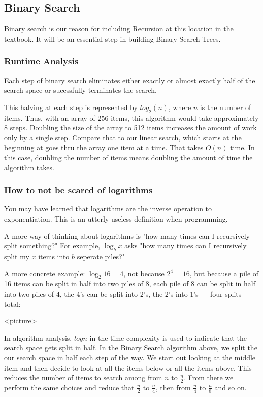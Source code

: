 \subsection{Binary Search}
Binary search is our reason for including Recursion at this location in the textbook.   It will be an essential step in building Binary Search Trees.







\subsubsection{Runtime Analysis}
Each step of binary search eliminates either exactly or almost exactly half of the search space or sucessfully terminates the search.

This halving at each step is represented by $log_2(n)$, where $n$ is the number of items.  Thus, with an array of 256 items, this algorithm would take approximately 8 steps. Doubling the size of the array to 512 items increases the amount of work only by a single step.   Compare that to our linear search, which starts at the beginning at goes thru the array one item at a time.  That takes $O(n)$ time.  In this case, doubling the number of items means doubling the amount of time the algorithm takes.





\subsubsection{How to not be scared of logarithms }
You may have learned that logarithms are the inverse operation to exponentiation.
This is an utterly useless definition when programming.


A more way of thinking about logarithms is "how many times can I recursively split something?"
For example, $\log_b x$ asks "how many times can I recursively split my $x$ items into $b$ seperate piles?"

A more concrete example: $\log_2 16 = 4$, not because $2^4 = 16$, but because a pile of 16 items can be split in half into two piles of 8, each pile of 8 can be split in half into two piles of 4, the 4's can be split into 2's, the 2's into 1's --- four splits total:

<picture>


In algorithm analysis, $log n$ in the time complexity is used to indicate that the search space gets split in half.
In the Binary Search algorithm above, we split the our search space in half each step of the way.  We start out looking at the middle item and then decide to look at all the items below or all the items above.  This reduces the number of items to search among from $n$ to $\frac{n}{2}$.  From there we perform the same choices and reduce that $\frac{n}{2}$ to $\frac{n}{4}$, then from  $\frac{n}{4}$ to  $\frac{n}{8}$ and so on.

